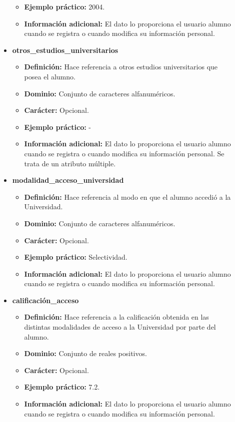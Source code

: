 \begin{description}
\begin{itemize}
\begin{itemize}
         \item \textbf{Ejemplo práctico:} 2004.
         \item \textbf{Información adicional:} El dato lo proporciona el usuario alumno cuando se registra o cuando modifica su información personal.
      \end{itemize}
   \item \textbf{otros\_estudios\_universitarios}
      \begin{itemize}
         \item \textbf{Definición:} Hace referencia a otros estudios universitarios que posea el alumno.
         \item \textbf{Dominio:} Conjunto de caracteres alfanuméricos.
         \item \textbf{Carácter:}  Opcional.
         \item \textbf{Ejemplo práctico:} -
         \item \textbf{Información adicional:} El dato lo proporciona el usuario alumno cuando se registra o cuando modifica su información personal. Se trata de un atributo múltiple.
      \end{itemize}
   \item \textbf{modalidad\_acceso\_universidad}
      \begin{itemize}
         \item \textbf{Definición:} Hace referencia al modo en que el alumno accedió a la Universidad.
         \item \textbf{Dominio:} Conjunto de caracteres alfanuméricos.
         \item \textbf{Carácter:}  Opcional.
         \item \textbf{Ejemplo práctico:} Selectividad.
         \item \textbf{Información adicional:} El dato lo proporciona el usuario alumno cuando se registra o cuando modifica su información personal.
      \end{itemize}
   \item \textbf{calificación\_acceso}
      \begin{itemize}
         \item \textbf{Definición:} Hace referencia a la calificación obtenida en las distintas modalidades de acceso a la Universidad por parte del alumno.
         \item \textbf{Dominio:} Conjunto de reales positivos.
         \item \textbf{Carácter:}  Opcional.
         \item \textbf{Ejemplo práctico:} 7.2.
         \item \textbf{Información adicional:} El dato lo proporciona el usuario alumno cuando se registra o cuando modifica su información personal.
      \end{itemize}
   \end{itemize}


\end{description}
